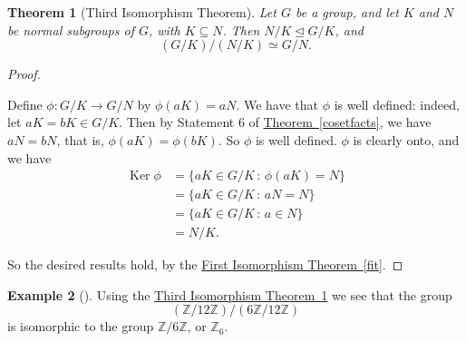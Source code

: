 \documentclass[10pt,]{book}
\theoremstyle{plain}
\newtheorem{theorem}{Theorem}[section]
\theoremstyle{definition}
\theoremstyle{definition}
\theoremstyle{definition}
\newtheorem{example}[theorem]{Example}
\theoremstyle{definition}
\numberwithin{equation}{section}
\def\Z{\mathbb{Z}}
\DeclareMathOperator{\Ker}{Ker}
\newcommand{\amp}{&}
\begin{document}
\begin{theorem}[{Third Isomorphism Theorem}]\label{tit}
Let \(G\) be a group, and let \(K\) and \(N\) be normal subgroups of \(G\), with \(K\subseteq N\). Then \(N/K \unlhd G/K\), and%
\begin{equation*}
(G/K)/(N/K)\simeq G/N.
\end{equation*}
%
\end{theorem}
\begin{proof}\hypertarget{proof-56}{}
Define \(\phi: G/K\to G/N\) by \(\phi(aK)=aN\). We have that \(\phi\) is well defined: indeed, let \(aK=bK \in G/K\). Then by Statement 6 of \hyperref[cosetfacts]{Theorem~\ref{cosetfacts}}, we have \(aN=bN\), that is, \(\phi(aK)=\phi(bK)\). So \(\phi\) is well defined. \(\phi\) is clearly onto, and we have%
\begin{align*}
\Ker \phi\amp =\{aK\in
G/K\,:\,\phi(aK)=N\}\\
\amp =\{aK\in G/K\,:\,aN=N\}\\
\amp =\{aK\in
G/K\,:\,a\in N\}\\
\amp =N/K.
\end{align*}
%
\par
So the desired results hold, by the \hyperref[fit]{First Isomorphism Theorem~\ref{fit}}.%
\end{proof}
\begin{example}[]\label{example-88}
Using the \hyperref[tit]{Third Isomorphism Theorem~\ref{tit}} we see that the group%
\begin{equation*}
(\Z/12\Z)/(6\Z/12\Z)
\end{equation*}
is isomorphic to the group \(\Z/6\Z\), or \(\Z_6\).%
\end{example}
\typeout{************************************************}
\typeout{************************************************}
\end{document}
